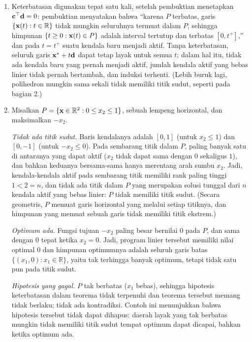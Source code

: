\begin{enumerate}
\item Keterbatasan digunakan tepat satu kali, setelah pembuktian menetapkan $\mathbf{c}^\top \mathbf{d} = 0$: pembuktian menyatakan bahwa “karena $P$ terbatas, garis $\{\mathbf{x}(t) : t \in \mathbb{R}\}$ tidak mungkin seluruhnya termuat dalam $P$, sehingga himpunan $\{t \geq 0 : \mathbf{x}(t) \in P\}$ adalah interval tertutup dan terbatas $[0, t^+]$,” dan pada $t = t^+$ suatu kendala baru menjadi aktif. Tanpa keterbatasan, seluruh garis $\mathbf{x}^* + t\mathbf{d}$ dapat tetap layak untuk semua $t$; dalam hal itu, tidak ada kendala baru yang pernah menjadi aktif, jumlah kendala aktif yang bebas linier tidak pernah bertambah, dan induksi terhenti. (Lebih buruk lagi, polihedron mungkin sama sekali tidak memiliki titik sudut, seperti pada bagian 2.)
\item Misalkan $P = \{\mathbf{x} \in \mathbb{R}^2 : 0 \leq x_2 \leq 1\}$, sebuah lempeng horizontal, dan maksimalkan $-x_2$.

\emph{Tidak ada titik sudut.} Baris kendalanya adalah $[0, 1]$ (untuk $x_2 \leq 1$) dan $[0, -1]$ (untuk $-x_2 \leq 0$). Pada sembarang titik dalam $P$, paling banyak satu di antaranya yang dapat aktif ($x_2$ tidak dapat sama dengan $0$ sekaligus $1$), dan bahkan keduanya bersama-sama hanya merentang arah sumbu $x_2$. Jadi, kendala-kendala aktif pada sembarang titik memiliki rank paling tinggi $1 < 2 = n$, dan tidak ada titik dalam $P$ yang merupakan solusi tunggal dari $n$ kendala aktif yang bebas linier: $P$ tidak memiliki titik sudut. (Secara geometris, $P$ memuat garis horizontal yang melalui setiap titiknya, dan himpunan yang memuat sebuah garis tidak memiliki titik ekstrem.)

\emph{Optimum ada.} Fungsi tujuan $-x_2$ paling besar bernilai $0$ pada $P$, dan sama dengan $0$ tepat ketika $x_2 = 0$. Jadi, program linier tersebut memiliki nilai optimal $0$ dan himpunan optimumnya adalah seluruh garis batas $\{(x_1, 0) : x_1 \in \mathbb{R}\}$, yaitu tak terhingga banyak optimum, tetapi tidak satu pun pada titik sudut.

\emph{Hipotesis yang gagal.} $P$ tak berbatas ($x_1$ bebas), sehingga hipotesis keterbatasan dalam teorema tidak terpenuhi dan teorema tersebut memang tidak berlaku; tidak ada kontradiksi. Contoh ini menunjukkan bahwa hipotesis tersebut tidak dapat dihapus: daerah layak yang tak berbatas mungkin tidak memiliki titik sudut tempat optimum dapat dicapai, bahkan ketika optimum ada.
\end{enumerate}

